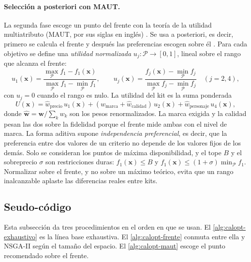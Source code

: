 \paragraph{Selección a posteriori con MAUT.} La segunda fase escoge un punto del
frente con la teoría de la utilidad multiatributo (MAUT, por sus siglas en
inglés) \cite{keeney_decisions_1976}. Se usa a posteriori, es decir, primero se
calcula el frente y después las preferencias escogen sobre él
\cite[cap.~2.2]{miettinen_nonlinear_1999}. Para cada objetivo se define una
\emph{utilidad normalizada} $u_j:\mathcal{P}\to[0,1]$, lineal sobre el rango
que alcanza el frente:
\[
  u_1(\mathbf{x})=\frac{\max_{\mathcal{P}}f_1-f_1(\mathbf{x})}{\max_{\mathcal{P}}f_1-\min_{\mathcal{P}}f_1},
  \qquad
  u_j(\mathbf{x})=\frac{f_j(\mathbf{x})-\min_{\mathcal{P}}f_j}{\max_{\mathcal{P}}f_j-\min_{\mathcal{P}}f_j}
  \quad(j=2,4),
\]
con $u_j=0$ cuando el rango es nulo. La utilidad del kit es la suma ponderada
\[
  U(\mathbf{x})=\hat w_{\mathrm{precio}}\,u_1(\mathbf{x})
  +(\hat w_{\mathrm{marca}}+\hat w_{\mathrm{calidad}})\,u_2(\mathbf{x})
  +\hat w_{\mathrm{personaje}}\,u_4(\mathbf{x}),
\]
donde $\hat{\mathbf{w}}=\mathbf{w}/\sum_k w_k$ son los pesos renormalizados. La
marca exigida y la calidad pesan las dos sobre la fidelidad porque el frente
mide ambas con el nivel de marca. La forma aditiva supone \emph{independencia
preferencial}, es decir, que la preferencia entre dos valores de un criterio no
depende de los valores fijos de los demás. Solo se consideran los puntos de
máxima disponibilidad, y el tope $B$ y el sobreprecio $\sigma$ son
restricciones duras: $f_1(\mathbf{x})\leq B$ y
$f_1(\mathbf{x})\leq(1+\sigma)\min_{\mathcal{P}}f_1$. Normalizar sobre el
frente, y no sobre un máximo teórico, evita que un rango inalcanzable aplaste
las diferencias reales entre kits.

\subsection{Seudo-código}
\label{sec:calopt-seudo}

Esta subsección da tres procedimientos en el orden en que se usan. El
\cref{alg:calopt-exhaustivo} es la línea base exhaustiva. El
\cref{alg:calopt-frente} conmuta entre ella y NSGA-II según el tamaño del
espacio. El \cref{alg:calopt-maut} escoge el punto recomendado sobre el frente.

